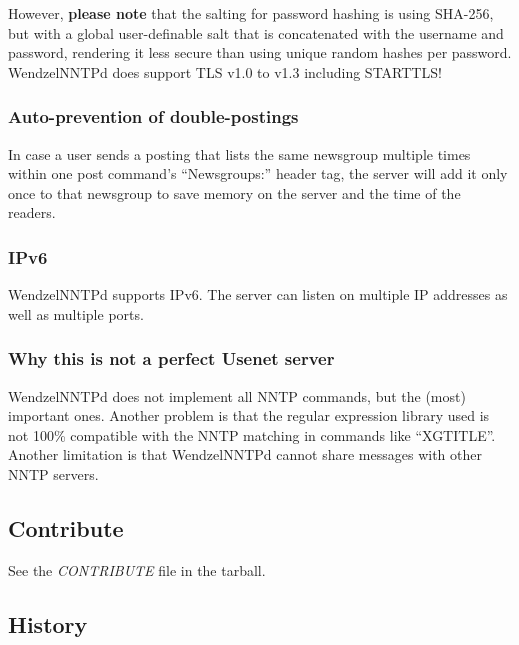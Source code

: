 \documentclass[12pt,fleqn,leqno]{scrbook}
\begin{document}
However, \textbf{please note} that the salting for password hashing is
using SHA-256, but with a global user-definable salt that is
concatenated with the username and password, rendering it less secure
than using unique random hashes per password. WendzelNNTPd does support
TLS v1.0 to v1.3 including STARTTLS!

\hypertarget{auto-prevention-of-double-postings}{%
\subsubsection{Auto-prevention of
double-postings}\label{auto-prevention-of-double-postings}}

In case a user sends a posting that lists the same newsgroup multiple
times within one post command's ``Newsgroups:'' header tag, the server
will add it only once to that newsgroup to save memory on the server and
the time of the readers.

\hypertarget{ipv6}{%
\subsubsection{IPv6}\label{ipv6}}

WendzelNNTPd supports IPv6. The server can listen on multiple IP
addresses as well as multiple ports.

\hypertarget{why-this-is-not-a-perfect-usenet-server}{%
\subsubsection{Why this is not a perfect Usenet
server}\label{why-this-is-not-a-perfect-usenet-server}}

WendzelNNTPd does not implement all NNTP commands, but the (most)
important ones. Another problem is that the regular expression library
used is not 100\% compatible with the NNTP matching in commands like
``XGTITLE''. Another limitation is that WendzelNNTPd cannot share
messages with other NNTP servers.

\hypertarget{contribute}{%
\subsection{Contribute}\label{contribute}}

See the \emph{CONTRIBUTE} file in the tarball.

\hypertarget{history}{%
\subsection{History}\label{history}}
\end{document}
